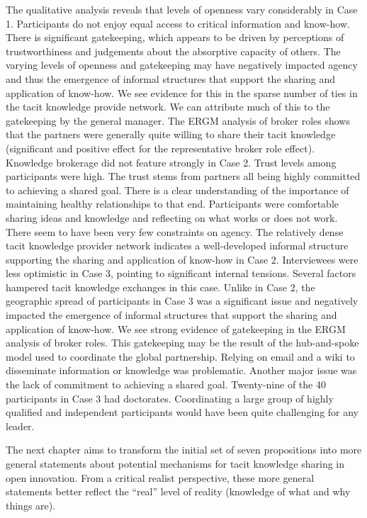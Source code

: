 The qualitative analysis reveals that levels of openness vary considerably in Case 1. Participants do not enjoy equal access to critical information and know-how. There is significant gatekeeping, which appears to be driven by perceptions of trustworthiness and judgements about the absorptive capacity of others. The varying levels of openness and gatekeeping may have negatively impacted agency and thus the emergence of informal structures that support the sharing and application of know-how. We see evidence for this in the sparse number of ties in the tacit knowledge provide network. We can attribute much of this to the gatekeeping by the general manager. The ERGM analysis of broker roles shows that the partners were generally quite willing to share their tacit knowledge (significant and positive effect for the representative broker role effect). Knowledge brokerage did not feature strongly in Case 2. Trust levels among participants were high. The trust stems from partners all being highly committed to achieving a shared goal. There is a clear understanding of the importance of maintaining healthy relationships to that end. Participants were comfortable sharing ideas and knowledge and reflecting on what works or does not work. There seem to have been very few constraints on agency. The relatively dense tacit knowledge provider network indicates a well-developed informal structure supporting the sharing and application of know-how in Case 2. Interviewees were less optimistic in Case 3, pointing to significant internal tensions. Several factors hampered tacit knowledge exchanges in this case. Unlike in Case 2, the geographic spread of participants in Case 3 was a significant issue and negatively impacted the emergence of informal structures that support the sharing and application of know-how. We see strong evidence of gatekeeping in the ERGM analysis of broker roles. This gatekeeping may be the result of the hub-and-spoke model used to coordinate the global partnership. Relying on email and a wiki to disseminate information or knowledge was problematic. Another major issue was the lack of commitment to achieving a shared goal. Twenty-nine of the 40 participants in Case 3 had doctorates. Coordinating a large group of highly qualified and independent participants would have been quite challenging for any leader. \medskip

The next chapter aims to transform the initial set of seven propositions into more general statements about potential mechanisms for tacit knowledge sharing in open innovation. From a critical realist perspective, these more general statements better reflect the \enquote{real} level of reality (knowledge of what and why things are). \medskip



